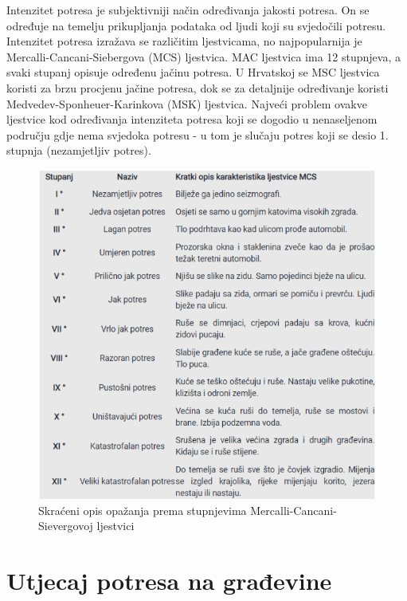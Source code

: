\documentclass[12pt]{book}
\begin{document}
Intenzitet potresa je subjektivniji način određivanja jakosti potresa. On se određuje na temelju prikupljanja podataka od ljudi koji su svjedočili potresu. Intenzitet potresa izražava se različitim ljestvicama, no najpopularnija je Mercalli-Cancani-Siebergova (MCS) ljestvica. MAC ljestvica ima 12 stupnjeva, a svaki stupanj opisuje određenu jačinu potresa. U Hrvatskoj se MSC ljestvica koristi za brzu procjenu jačine potresa, dok se za detaljnije određivanje koristi Medvedev-Sponheuer-Karinkova (MSK) ljestvica. Najveći problem ovakve ljestvice kod određivanja intenziteta potresa koji se dogodio u nenaseljenom području gdje nema svjedoka potresu - u tom je slučaju potres koji se desio 1. stupnja (nezamjetljiv potres). \cite{richterova_vjesnik}

\begin{figure}[H]
	\centering
	\includegraphics[width=0.8\linewidth]{Slike/MCS_ljestvica}
	\caption{Skraćeni opis opažanja prema stupnjevima Mercalli-Cancani-Sievergovoj ljestvici \cite{richterova_vjesnik}}
	\label{fig:mcsljestvica}
\end{figure}


\section{Utjecaj potresa na građevine}
\end{document}

